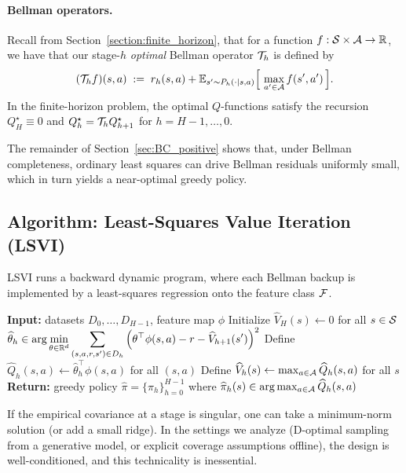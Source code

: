 \paragraph{Bellman operators.}
Recall from
Section~\ref{section:finite_horizon}, that
for a function $f:\mathcal{S}\times\mathcal{A}\to\mathbb{R}$, we have that our stage-$h$ \emph{optimal}
Bellman operator $\mathcal{T}_h$ is defined by
\[
(\mathcal{T}_h f)(s,a)
\;:=\;
r_h(s,a) + \mathbb{E}_{s'\sim P_h(\cdot\mid s,a)}\Big[\,\max_{a'\in\mathcal{A}} f(s',a')\,\Big].
\]
In the finite-horizon problem, the optimal $Q$-functions satisfy the recursion
$Q^\star_H \equiv 0$ and $Q^\star_h = \mathcal{T}_h Q^\star_{h+1}$ for $h=H-1,\dots,0$.

The remainder of Section~\ref{sec:BC_positive} shows that, under Bellman
completeness, ordinary least squares can drive Bellman residuals uniformly small,
which in turn yields a near-optimal greedy policy.

\subsection{Algorithm: Least-Squares Value Iteration (LSVI)}
\label{subsec:BC_lsvi_alg}

LSVI runs a backward dynamic program, where each Bellman backup is implemented by
a least-squares regression onto the feature class $\mathcal{F}$.

\begin{algorithm}[t]
\begin{algorithmic}[1]
\State \textbf{Input:} datasets $D_0,\dots,D_{H-1}$, feature map $\phi$
\State Initialize $\widehat V_{H}(s) \gets 0$ for all $s\in\mathcal{S}$
    \State $\displaystyle
    \widehat\theta_{h}
    \in \arg\min_{\theta\in\mathbb{R}^d}
    \sum_{(s,a,r,s')\in D_h}
    \Big(\theta^\top\phi(s,a) - r - \widehat V_{h+1}(s')\Big)^2$
    \State Define $\widehat Q_h(s,a) \gets \widehat\theta_h^\top\phi(s,a)$ for all $(s,a)$
    \State Define $\widehat V_h(s) \gets \max_{a\in\mathcal{A}}\widehat Q_h(s,a)$ for all $s$
\EndFor
\State \textbf{Return:} greedy policy $\widehat\pi=\{\widehat\pi_h\}_{h=0}^{H-1}$ where
$\widehat\pi_h(s)\in\arg\max_{a\in\mathcal{A}}\widehat Q_h(s,a)$
\end{algorithmic}
\caption{Least-Squares Value Iteration (LSVI)}
\label{alg:lsvi}
\end{algorithm}


If the empirical covariance at a stage is singular, one can take a minimum-norm
solution (or add a small ridge). In the settings we analyze (D-optimal sampling
from a generative model, or explicit coverage assumptions offline), the design
is well-conditioned, and this technicality is inessential.


